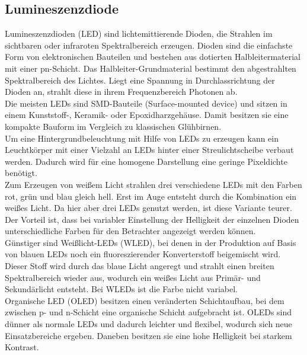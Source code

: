 \subsection{Lumineszenzdiode}
Lumineszenzdioden (LED) sind lichtemittierende Dioden, die Strahlen im sichtbaren oder infraroten Spektralbereich erzeugen. Dioden sind die einfachste Form von elektronischen Bauteilen und bestehen aus dotierten Halbleitermaterial mit einer pn-Schicht. Das Halbleiter-Grundmaterial bestimmt den abgestrahlten Spektralbereich des Lichtes. Liegt eine Spannung in Durchlassrichtung der Dioden an, strahlt diese in ihrem Frequenzbereich Photonen ab. \cite[Vgl. Seite 193 f.]{LofflerMang.2020} \\
Die meisten LEDs sind SMD-Bauteile (Surface-mounted device) und sitzen in einem Kunststoff-, Keramik- oder Epoxidharzgehäuse. Damit besitzen sie eine kompakte Bauform im Vergleich zu klassischen Glühbirnen. \\
Um eine Hintergrundbeleuchtung mit Hilfe von LEDs zu erzeugen kann ein Leuchtkörper mit einer Vielzahl an LEDs hinter einer Streulichtscheibe verbaut werden. Dadurch wird für eine homogene Darstellung eine geringe Pixeldichte benötigt. \cite[Vgl. Seite 194]{LofflerMang.2020} \\
Zum Erzeugen von weißem Licht strahlen drei verschiedene LEDs mit den Farben rot, grün und blau gleich hell. Erst im Auge entsteht durch die Kombination ein weißes Licht. Da hier aber drei LEDs genutzt werden, ist diese Variante teurer. Der Vorteil ist, dass bei variabler Einstellung der Helligkeit der einzelnen Dioden unterschiedliche Farben für den Betrachter angezeigt werden können. \\ 
Günstiger sind Weißlicht-LEDs (WLED), bei denen in der Produktion auf Basis von blauen LEDs noch ein fluoreszierender Konverterstoff beigemischt wird. Dieser Stoff wird durch das blaue Licht angeregt und strahlt einen breiten Spektralbereich wieder aus, wodurch ein weißes Licht aus Primär- und Sekundärlicht entsteht. Bei WLEDs ist die Farbe nicht variabel. \cite[Vgl. Seite 194]{LofflerMang.2020} \\
Organische LED (OLED) besitzen einen veränderten Schichtaufbau, bei dem zwischen p- und n-Schicht eine organische Schicht aufgebracht ist. OLEDs sind dünner als normale LEDs und dadurch leichter und flexibel, wodurch sich neue Einsatzbereiche ergeben. Daneben besitzen sie eine hohe Helligkeit bei starkem Kontrast. \cite[Vgl. Seite 195]{LofflerMang.2020}
